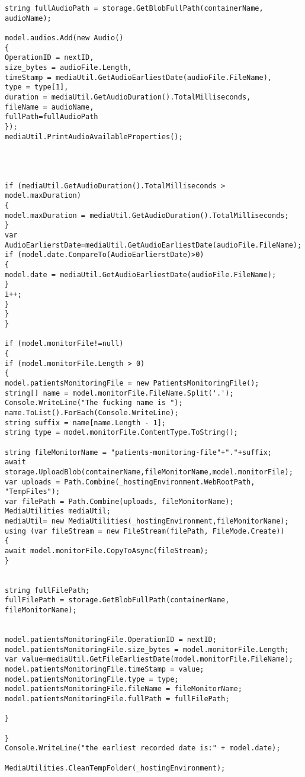 \begin{lstlisting}
string fullAudioPath = storage.GetBlobFullPath(containerName, audioName);

model.audios.Add(new Audio()
{
OperationID = nextID,
size_bytes = audioFile.Length,
timeStamp = mediaUtil.GetAudioEarliestDate(audioFile.FileName),
type = type[1],
duration = mediaUtil.GetAudioDuration().TotalMilliseconds,
fileName = audioName,
fullPath=fullAudioPath
});
mediaUtil.PrintAudioAvailableProperties();




if (mediaUtil.GetAudioDuration().TotalMilliseconds > model.maxDuration)
{
model.maxDuration = mediaUtil.GetAudioDuration().TotalMilliseconds;
}
var AudioEarlierstDate=mediaUtil.GetAudioEarliestDate(audioFile.FileName);
if (model.date.CompareTo(AudioEarlierstDate)>0)
{
model.date = mediaUtil.GetAudioEarliestDate(audioFile.FileName);
}
i++;
}
}
}

if (model.monitorFile!=null)
{
if (model.monitorFile.Length > 0)
{
model.patientsMonitoringFile = new PatientsMonitoringFile();
string[] name = model.monitorFile.FileName.Split('.');
Console.WriteLine("The fucking name is ");
name.ToList().ForEach(Console.WriteLine);
string suffix = name[name.Length - 1];
string type = model.monitorFile.ContentType.ToString();

string fileMonitorName = "patients-monitoring-file"+"."+suffix;
await storage.UploadBlob(containerName,fileMonitorName,model.monitorFile);
var uploads = Path.Combine(_hostingEnvironment.WebRootPath, "TempFiles");
var filePath = Path.Combine(uploads, fileMonitorName);
MediaUtilities mediaUtil;
mediaUtil= new MediaUtilities(_hostingEnvironment,fileMonitorName);
using (var fileStream = new FileStream(filePath, FileMode.Create))
{
await model.monitorFile.CopyToAsync(fileStream);
}


string fullFilePath;
fullFilePath = storage.GetBlobFullPath(containerName, fileMonitorName);


model.patientsMonitoringFile.OperationID = nextID;
model.patientsMonitoringFile.size_bytes = model.monitorFile.Length;
var value=mediaUtil.GetFileEarliestDate(model.monitorFile.FileName);
model.patientsMonitoringFile.timeStamp = value;
model.patientsMonitoringFile.type = type;
model.patientsMonitoringFile.fileName = fileMonitorName;
model.patientsMonitoringFile.fullPath = fullFilePath;

}

}
Console.WriteLine("the earliest recorded date is:" + model.date);

MediaUtilities.CleanTempFolder(_hostingEnvironment);



\end{lstlisting}
